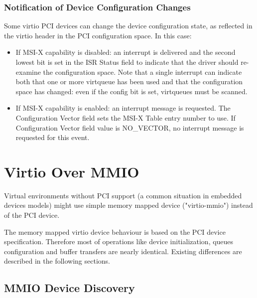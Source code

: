 \subsubsection{Notification of Device Configuration Changes}\label{sec:Virtio Transport Options / Virtio Over PCI Bus / PCI-specific Initialization And Device Operation / Notification of Device Configuration Changes}

Some virtio PCI devices can change the device configuration
state, as reflected in the virtio header in the PCI configuration
space. In this case:

\begin{itemize}
  \item If MSI-X capability is disabled: an interrupt is delivered and
  the second lowest bit is set in the ISR Status field to
  indicate that the driver should re-examine the configuration
  space.  Note that a single interrupt can indicate both that one
  or more virtqueue has been used and that the configuration
  space has changed: even if the config bit is set, virtqueues
  must be scanned.

  \item If MSI-X capability is enabled: an interrupt message is
  requested. The Configuration Vector field sets the MSI-X Table
  entry number to use. If Configuration Vector field value is
  NO_VECTOR, no interrupt message is requested for this event.
\end{itemize}

\section{Virtio Over MMIO}\label{sec:Virtio Transport Options / Virtio Over MMIO}

Virtual environments without PCI support (a common situation in
embedded devices models) might use simple memory mapped device
("virtio-mmio") instead of the PCI device.

The memory mapped virtio device behaviour is based on the PCI
device specification. Therefore most of operations like device
initialization, queues configuration and buffer transfers are
nearly identical. Existing differences are described in the
following sections.

\subsection{MMIO Device Discovery}\label{sec:Virtio Transport Options / Virtio Over MMIO / MMIO Device Discovery}

